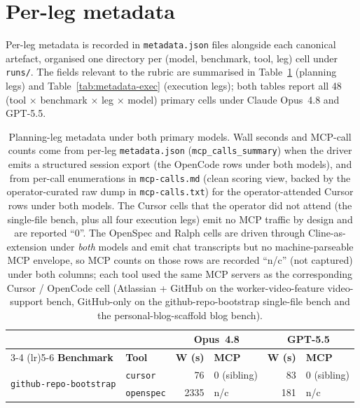 \section{Per-leg metadata}
\label{app:metadata}

Per-leg metadata is recorded in \texttt{metadata.json} files alongside
each canonical artefact, organised one directory per
(model, benchmark, tool, leg) cell under \texttt{runs/}. The fields
relevant to the rubric are summarised in
Table~\ref{tab:metadata-plan} (planning legs) and
Table~\ref{tab:metadata-exec} (execution legs); both tables report all
48 (tool $\times$ benchmark $\times$ leg $\times$ model) primary
cells under Claude Opus~4.8 and GPT-5.5.

\begin{table}[h]
\centering
\caption{Planning-leg metadata under both primary models. Wall seconds
and MCP-call counts come from per-leg \texttt{metadata.json}
(\texttt{mcp\_calls\_summary}) when the driver emits a structured
session export (the OpenCode rows under both models), and from per-call
enumerations in \texttt{mcp-calls.md} (clean scoring view, backed by
the operator-curated raw dump in \texttt{mcp-calls.txt}) for the
operator-attended Cursor rows under both models. The Cursor cells
that the operator did not attend (the single-file bench, plus all four
execution legs) emit no MCP traffic by design and are reported ``0''.
The OpenSpec and Ralph cells are driven through Cline-as-extension
under \emph{both} models and emit chat transcripts but no
machine-parseable MCP envelope, so MCP counts on those rows are
recorded ``n/c'' (not captured) under both columns; each tool used
the same MCP servers as the corresponding Cursor / OpenCode cell
(Atlassian + GitHub on the worker-video-feature video-support bench,
GitHub-only on the github-repo-bootstrap single-file bench and the
personal-blog-scaffold blog bench).}
\label{tab:metadata-plan}
\small
\setlength{\tabcolsep}{4pt}
\begin{tabular}{ll rl rl}
\toprule
 & & \multicolumn{2}{c}{Opus~4.8} & \multicolumn{2}{c}{GPT-5.5} \\
 \cmidrule(lr){3-4} \cmidrule(lr){5-6}
\textbf{Benchmark} & \textbf{Tool} & \textbf{W (s)} & \textbf{MCP} & \textbf{W (s)} & \textbf{MCP} \\
\midrule
\multirow{4}{*}{\texttt{github-repo-bootstrap}}
  & \texttt{cursor}     &   76 & 0 (sibling)        &  83 & 0 (sibling)         \\
  & \texttt{openspec}   & 2335 & n/c                & 181 & n/c                 \\

\end{tabular}
\end{table}
